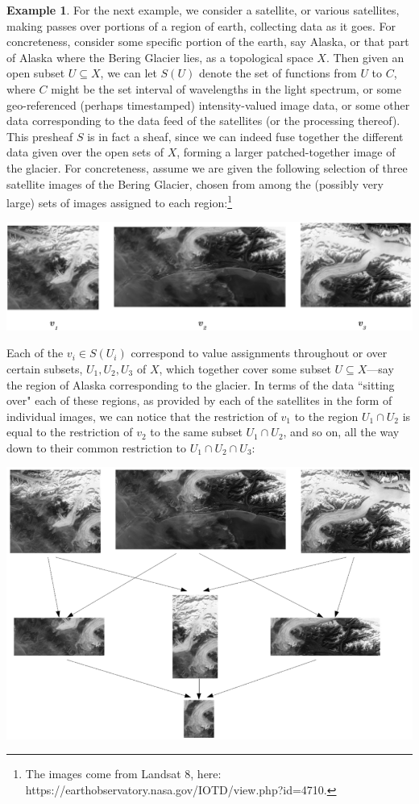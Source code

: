 \documentclass[a4paper]{book}
\theoremstyle{definition}
\newtheorem{example}{Example}[section]
\theoremstyle{definition}
\theoremstyle{definition}
\theoremstyle{theorem}
\theoremstyle{definition}
\begin{document}
\begin{example} 	
	For the next example, we consider a satellite, or various satellites, making passes over portions of a region of earth, collecting data as it goes. For concreteness, consider some specific portion of the earth, say Alaska, or that part of Alaska where the Bering Glacier lies, as a topological space $X$. Then given an open subset $U \subseteq  X$, we can let $S(U)$ denote the set of functions from $U$ to $C$, where $C$ might be the set interval of wavelengths in the light spectrum, or some geo-referenced (perhaps timestamped) intensity-valued image data, or some other data corresponding to the data feed of the satellites (or the processing thereof). This presheaf $S$ is in fact a sheaf, since we can indeed fuse together the different data given over the open sets of $X$, forming a larger patched-together image of the glacier. For concreteness, assume we are given the following selection of three satellite images of the Bering Glacier, chosen from among the (possibly very large) sets of images assigned to each region:\footnote{The images come from Landsat 8, here: {https://earthobservatory.nasa.gov/IOTD/view.php?id=4710}.} 
	\begin{center}
		\includegraphics[scale=0.27]{GlacierSheafInitialPicsBW.png}  
	\end{center}
	Each of the $v_i \in S(U_i)$ correspond to value assignments throughout or over certain subsets, $U_1, U_2, U_3$ of $X$, which together cover some subset $U \subseteq  X$---say the region of Alaska corresponding to the glacier. In terms of the data ``sitting over" each of these regions, as provided by each of the satellites in the form of individual images, we can notice that the restriction of $v_1$ to the region $U_1 \cap U_2$ is equal to the restriction of $v_2$ to the same subset $U_1 \cap U_2$, and so on, all the way down to their common restriction to $U_1 \cap U_2 \cap U_3$:
	\begin{center}
		\includegraphics[scale=0.37]{GlacierSheafBW.png}

\end{center}
\end{example}
\end{document}
